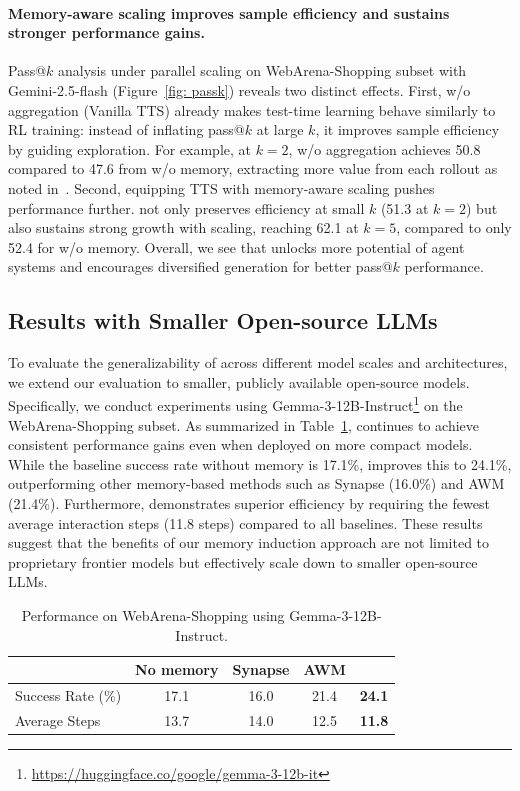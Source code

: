 \paragraph{Memory-aware scaling improves sample efficiency and sustains stronger performance gains.}
Pass@$k$ analysis under parallel scaling on WebArena-Shopping subset with Gemini-2.5-flash (Figure~\ref{fig: passk}) reveals two distinct effects. First, \mats{} w/o aggregation (Vanilla TTS) already makes test-time learning behave similarly to RL training: instead of inflating pass@$k$ at large $k$, it improves sample efficiency by guiding exploration. For example, at $k=2$, \mats{} w/o aggregation achieves 50.8 compared to 47.6 from \mats{} w/o memory, extracting more value from each rollout as noted in~\citep{yue2025does}. Second, equipping TTS with memory-aware scaling pushes performance further. \mats{} not only preserves efficiency at small $k$ (51.3 at $k=2$) but also sustains strong growth with scaling, reaching 62.1 at $k=5$, compared to only 52.4 for \mats{} w/o memory. Overall, we see that \mats{} unlocks more potential of agent systems and encourages diversified generation for better pass@$k$ performance.

\subsection{Results with Smaller Open-source LLMs}
To evaluate the generalizability of \ours{} across different model scales and architectures, we extend our evaluation to smaller, publicly available open-source models. Specifically, we conduct experiments using Gemma-3-12B-Instruct\footnote{\url{https://huggingface.co/google/gemma-3-12b-it}} on the WebArena-Shopping subset. As summarized in Table~\ref{tab:gemma_results}, \ours{} continues to achieve consistent performance gains even when deployed on more compact models. While the baseline success rate without memory is 17.1\%, \ours{} improves this to 24.1\%, outperforming other memory-based methods such as Synapse (16.0\%) and AWM (21.4\%). Furthermore, \ours{} demonstrates superior efficiency by requiring the fewest average interaction steps (11.8 steps) compared to all baselines. These results suggest that the benefits of our memory induction approach are not limited to proprietary frontier models but effectively scale down to smaller open-source LLMs.

\begin{table}[h]
\centering
\caption{Performance on WebArena-Shopping using Gemma-3-12B-Instruct.}
\label{tab:gemma_results}
\begin{tabular}{lcccc}
\toprule
 & \textbf{No memory} & \textbf{Synapse} & \textbf{AWM} & \textbf{\ours{}} \\ \midrule
Success Rate (\%) & 17.1 & 16.0 & 21.4 & \textbf{24.1} \\
Average Steps & 13.7 & 14.0 & 12.5 & \textbf{11.8} \\ \bottomrule
\end{tabular}
\end{table}

